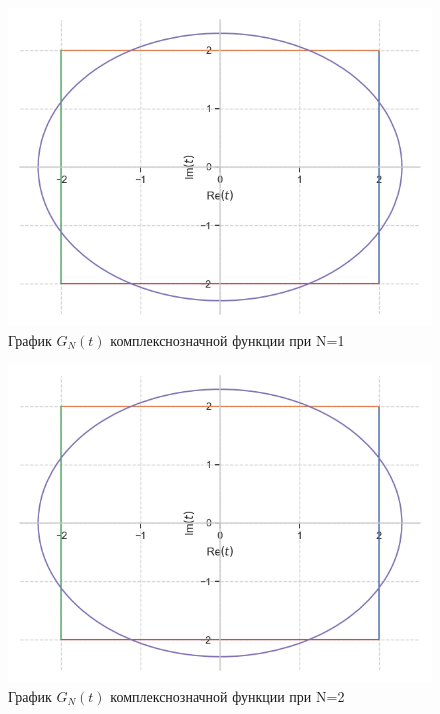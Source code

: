 \documentclass[a4paper, 16pt]{article}
\begin{document}
\newpage
\vspace*{10mm}
\begin{figure}[!htb]
    \centering
    \includegraphics[scale=0.8]{fur_cf_n=1.png}
    \captionsetup{skip=0pt}
    \caption{График $G_N(t)$ комплекснозначной функции при N=1}
    \label{Рис:36}
\end{figure}
\begin{figure}[!htb]
    \centering
    \includegraphics[scale=0.8]{fur_cf_n=2.png}
    \captionsetup{skip=0pt}
    \caption{График $G_N(t)$ комплекснозначной функции при N=2}
    \label{Рис:37}
\end{figure}
\newpage
\end{document}
